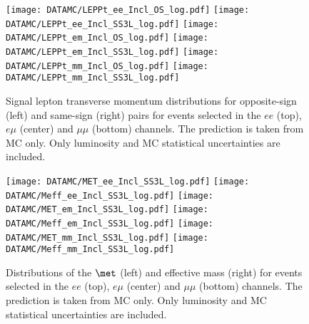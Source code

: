 \begin{figure}[htb!]
\centering
{\texttt{[image: DATAMC/LEPPt\_ee\_Incl\_OS\_log.pdf]}}
{\texttt{[image: DATAMC/LEPPt\_ee\_Incl\_SS3L\_log.pdf]}}
{\texttt{[image: DATAMC/LEPPt\_em\_Incl\_OS\_log.pdf]}}
{\texttt{[image: DATAMC/LEPPt\_em\_Incl\_SS3L\_log.pdf]}}
{\texttt{[image: DATAMC/LEPPt\_mm\_Incl\_OS\_log.pdf]}}
{\texttt{[image: DATAMC/LEPPt\_mm\_Incl\_SS3L\_log.pdf]}}
\caption{Signal lepton transverse momentum distributions for opposite-sign (left) and same-sign (right) pairs for events selected in the $ee$ (top), $e\mu$ (center) and $\mu\mu$ (bottom) channels.  The prediction is taken from MC only.
Only luminosity and MC statistical uncertainties are included.
}
\label{fig:dataMC_lep1}
\end{figure}

\begin{figure}[htb!]
\centering
{\texttt{[image: DATAMC/MET\_ee\_Incl\_SS3L\_log.pdf]}}
{\texttt{[image: DATAMC/Meff\_ee\_Incl\_SS3L\_log.pdf]}}
{\texttt{[image: DATAMC/MET\_em\_Incl\_SS3L\_log.pdf]}}
{\texttt{[image: DATAMC/Meff\_em\_Incl\_SS3L\_log.pdf]}}
{\texttt{[image: DATAMC/MET\_mm\_Incl\_SS3L\_log.pdf]}}
{\texttt{[image: DATAMC/Meff\_mm\_Incl\_SS3L\_log.pdf]}}
\caption{Distributions of the $\met$ (left) and effective mass (right) for events selected in the $ee$ (top), $e\mu$ (center) and $\mu\mu$ (bottom) channels. 
 The prediction is taken from MC only.
 Only luminosity and MC statistical uncertainties are included.
}
\label{fig:dataMC_metmeff}
\end{figure}
